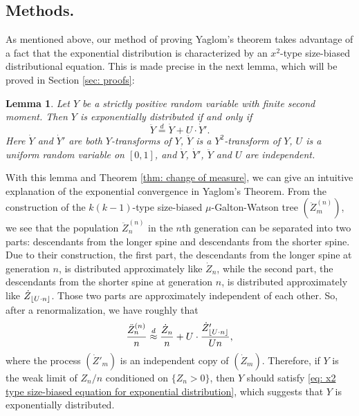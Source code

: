 \documentclass[12pt,a4paper]{amsart}
\DeclarePairedDelimiter\floor{\lfloor}{\rfloor}
\newtheorem{lem}[thm]{Lemma}
\numberwithin{equation}{section}
\begin{document}
\subsection{Methods.}
	As mentioned above, our method of proving Yaglom's theorem takes advantage of a fact that the exponential distribution is characterized by an $x^2$-type size-biased distributional equation.
	This is made precise in the next lemma, which will be proved in Section \ref{sec: proofs}:
\begin{lem} \label{lem: our equation}
	Let $Y$ be a strictly positive random variable with finite second moment.
	Then $Y$ is exponentially distributed if and only if
\begin{equation}
\label{eq: x2 type size-biased equation for exponential distribution}
	\ddot Y \overset{d}
	= \dot Y + U \cdot \dot Y'.
\end{equation}
	Here $\dot Y$ and $\dot Y'$ are both $Y$-transforms of  $Y$, 
$\ddot Y$ is a $Y^2$-transform of $Y$, 
	$U$ is a uniform random variable on $[0,1]$, and $\dot Y$, $\dot Y'$, $\ddot Y$ 
	and $U$ are independent.
\end{lem}	
	With this lemma and Theorem \ref{thm: change of measure}, we can give an intuitive explanation of the exponential convergence in Yaglom's Theorem.
	From the construction of the $k(k-1)$-type size-biased $\mu$-Galton-Watson tree $(\ddot Z^{(n)}_m)$, we see that the population $\ddot Z^{(n)}_n$ in 
   the $n$th generation can be separated into two parts: descendants 
	from the longer spine and descendants from the shorter spine.
	Due to their construction,
	the first part, the descendants from the longer spine at generation $n$,
	is distributed approximately like $\dot Z_n$,
	while the second part, the descendants from the shorter spine at generation $n$,
		is distributed approximately like $\dot Z_{ \floor{U\cdot n}}$.
	Those two parts are approximately independent of each other.
	So, after a renormalization, we have roughly that
\begin{equation}
\label{eq: Our insight}
	\frac{\ddot Z_n^{(n)}}{n}
	\overset{d} \approx \frac{\dot Z_n}{n} + 
			U \cdot \frac{   \dot Z'_{  \floor{ U \cdot n }  }   }    {   Un   },
\end{equation}
		where the process $(\dot Z'_m)$ is an independent copy of $(\dot Z_m)$.
	Therefore, if $Y$ is the weak limit of $Z_n/n$ conditioned on $\{Z_n > 0\}$,
	then $Y$ should satisfy \eqref{eq: x2 type size-biased equation for exponential distribution}, which suggests that $Y$ is exponentially distributed.
	
\end{document}
